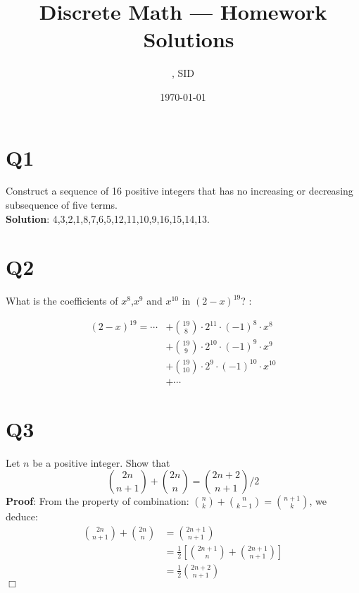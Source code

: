 \documentclass[a4paper,11pt]{article}
\title{Discrete Math --- Homework \Homework \ Solutions}
\author{\Name, SID \SID}
\date{\today}
\def\endproofmark{$\Box$}
\newenvironment{proof}{{\bf Proof}:}{\endproofmark\smallskip}
\newenvironment{solution}{{\\\bf Solution}:}{\smallskip}
\begin{document}
\maketitle

\section*{Q1}
Construct a sequence of 16 positive integers that has no
increasing or decreasing subsequence of ﬁve terms.
\begin{solution}
    4,3,2,1,8,7,6,5,12,11,10,9,16,15,14,13.
\end{solution}

\section*{Q2}
What is the coeﬃcients of $x^{8}$,$x^{9}$ and $x^{10}$ in $(2-x)^{19}$?
\begin{solution}

\begin{align*}
(2-x)^{19} = \cdots 
    &+ \binom{19}{8} \cdot 2^{11}\cdot (-1)^{8} \cdot  x^{8}\\
    &+ \binom{19}{9}\cdot 2^{10} \cdot (-1)^{9}\cdot x^{9}\\
    &+ \binom{19}{10}\cdot 2^{9}\cdot (-1)^{10}\cdot x^{10}\\
    &+ \cdots 
\end{align*}
\end{solution}

\section*{Q3}
Let $n$ be a positive integer. Show that
$$
\binom{2n }{n+1 }+\binom{2n }{n}=\binom{2n+2 }{n+1 } / 2
$$
\begin{proof}
From the property of combination: 
$\binom{n }{k}+\binom{n }{k-1}=\binom{n+1 }{k}$, we deduce:
\begin{align*}
  \binom{2n }{n+1}+\binom{2n }{n}&=\binom{2n+1 }{n+1}\\
  &=\frac{1}{2}\left[\binom{2n+1 }{n}+\binom{2n+1}{n+1}\right]\\
  &=\frac{1}{2 }\binom{2n+2}{n+1}
\end{align*}
\end{proof}
\end{document}
